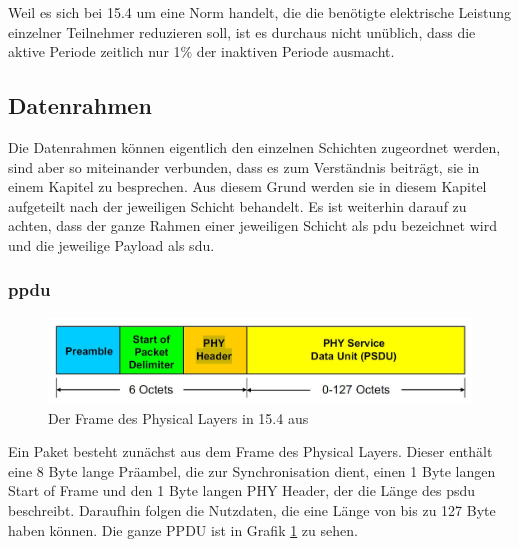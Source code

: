 Weil es sich bei 15.4 um eine Norm handelt, die die benötigte elektrische Leistung einzelner Teilnehmer reduzieren soll, ist es durchaus nicht unüblich, dass die aktive Periode zeitlich nur 1\% der inaktiven Periode ausmacht.\\

\subsection{Datenrahmen}
Die Datenrahmen können eigentlich den einzelnen Schichten zugeordnet werden, sind aber so miteinander verbunden, dass es zum Verständnis beiträgt, sie in einem Kapitel zu besprechen. Aus diesem Grund werden sie in diesem Kapitel aufgeteilt nach der jeweiligen Schicht behandelt. Es ist weiterhin darauf zu achten, dass der ganze Rahmen einer jeweiligen Schicht als \ac{pdu} bezeichnet wird und die jeweilige Payload als \ac{sdu}.

\subsubsection{\ac{ppdu}}
\begin{figure}
	\centering
	\includegraphics[width=\textwidth]{Grafiken-Alex/ppdu.jpg}
	\caption{Der Frame des Physical Layers in 15.4 aus \cite{rubinstein}}
	\label{ppdu}
\end{figure}
Ein Paket besteht zunächst aus dem Frame des Physical Layers. Dieser enthält eine 8 Byte lange Präambel, die zur Synchronisation dient, einen 1 Byte langen Start of Frame und den 1 Byte langen PHY Header, der die Länge des \ac{psdu} beschreibt. Daraufhin folgen die Nutzdaten, die eine Länge von bis zu 127 Byte haben können. Die ganze PPDU ist in Grafik \ref{ppdu} zu sehen. 

